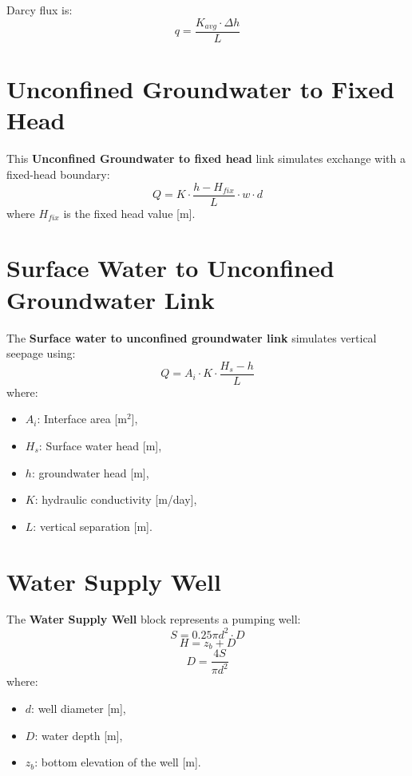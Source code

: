 \documentclass[12pt]{report}
\begin{document}
Darcy flux is:
\begin{equation}
q = \frac{K_{avg} \cdot \Delta h}{L}
\end{equation}

\section{Unconfined Groundwater to Fixed Head}

This \textbf{Unconfined Groundwater to fixed head} link simulates exchange with a fixed-head boundary:
\begin{equation}
Q = K \cdot \frac{h - H_{fix}}{L} \cdot w \cdot d
\end{equation}
where $H_{fix}$ is the fixed head value [m].

\section{Surface Water to Unconfined Groundwater Link}

The \textbf{Surface water to unconfined groundwater link} simulates vertical seepage using:
\begin{equation}
Q = A_i \cdot K \cdot \frac{H_s - h}{L}
\end{equation}
where:
\begin{itemize}
\item $A_i$: Interface area [m$^2$],
\item $H_s$: Surface water head [m],
\item $h$: groundwater head [m],
\item $K$: hydraulic conductivity [m/day],
\item $L$: vertical separation [m].
\end{itemize}

\section{Water Supply Well}

The \textbf{Water Supply Well} block represents a pumping well:
\begin{equation}
S = 0.25 \pi d^2 \cdot D
\end{equation}
\begin{equation}
H = z_b + D
\end{equation}
\begin{equation}
D = \frac{4S}{\pi d^2}
\end{equation}
where:
\begin{itemize}
\item $d$: well diameter [m],
\item $D$: water depth [m],
\item $z_b$: bottom elevation of the well [m].
\end{itemize}
\end{document}
